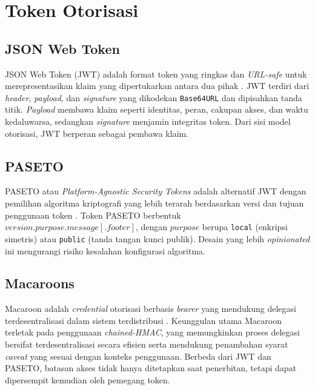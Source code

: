 \section{Token Otorisasi}
\label{sec:token-otorisasi}

\subsection{JSON Web Token}
\label{subsec:json-web-token}

JSON Web Token (JWT) adalah format token yang ringkas dan \textit{URL-safe} untuk merepresentasikan klaim yang dipertukarkan antara dua pihak \autocite{jones2015jwt}. JWT terdiri dari \textit{header}, \textit{payload}, dan \textit{signature} yang dikodekan \texttt{Base64URL} dan dipisahkan tanda titik. \textit{Payload} membawa klaim seperti identitas, peran, cakupan akses, dan waktu kedaluwarsa, sedangkan \textit{signature} menjamin integritas token. Dari sisi model otorisasi, JWT berperan sebagai pembawa klaim.

\subsection{PASETO}
\label{subsec:paseto}

PASETO atau \textit{Platform-Agnostic Security Tokens} adalah alternatif JWT dengan pemilihan algoritma kriptografi yang lebih terarah berdasarkan versi dan tujuan penggunaan token \autocite{arciszewski2022paseto}. Token PASETO berbentuk $version.purpose.message[.footer]$, dengan $purpose$ berupa \texttt{local} (enkripsi simetris) atau \texttt{public} (tanda tangan kunci publik). Desain yang lebih \textit{opinionated} ini mengurangi risiko kesalahan konfigurasi algoritma.

\subsection{Macaroons}
\label{sec:macaroons}

Macaroon adalah \textit{credential} otorisasi berbasis \textit{bearer} yang mendukung delegasi terdesentralisasi dalam sistem terdistribusi \autocite{birgisson2014macaroons}. Keunggulan utama Macaroon terletak pada penggunaan \textit{chained-HMAC}, yang memungkinkan proses delegasi bersifat terdesentralisasi secara efisien serta mendukung penambahan syarat \textit{caveat} yang sesuai dengan konteks penggunaan. Berbeda dari JWT dan PASETO, batasan akses tidak hanya ditetapkan saat penerbitan, tetapi dapat dipersempit kemudian oleh pemegang token.

